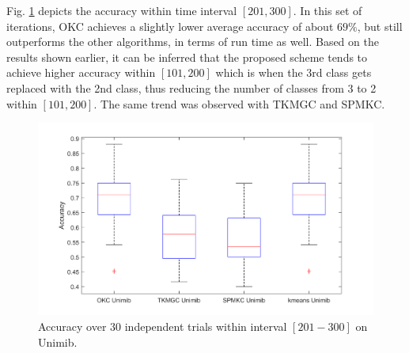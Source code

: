 \documentclass[10pt,final]{IEEEtran}
\begin{document}
Fig. \ref{Fig:11} depicts the accuracy within time interval $[201, 300]$. In this set of iterations, OKC achieves a slightly lower average accuracy of about $69\%$, but still outperforms the other algorithms, in terms of run time as well. Based on the results shown earlier, it can be inferred that the proposed scheme tends to achieve higher accuracy within $[101,200]$ which is when the 3rd class gets replaced with the 2nd class, thus reducing the number of classes from 3 to 2 within $[101,200]$. The same trend was observed with TKMGC and SPMKC. 
\begin{figure}[htp]
    \centering
    \includegraphics[scale=0.18]{boxplot_4_methods_201-300.png}
    \caption{Accuracy over 30 independent trials within interval $[201-300]$ on Unimib.}
    \label{Fig:11}
\end{figure}
\end{document}
